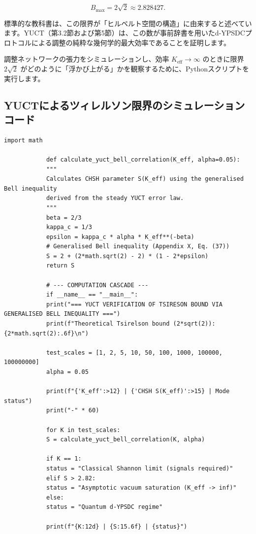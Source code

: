 \documentclass[12pt,a4paper]{article}
\begin{document}
	\[
	B_{\mathrm{max}} = 2\sqrt{2} \approx 2.828427.
	\]
	
	標準的な教科書は、この限界が「ヒルベルト空間の構造」に由来すると述べています。YUCT（第3.2節および第5節）は、この数が事前辞書を用いたd‑YPSDCプロトコルによる調整の純粋な幾何学的最大効率であることを証明します。
	
	調整ネットワークの張力をシミュレーションし、効率 \(K_{\mathrm{eff}} \to \infty\) のときに限界 \(2\sqrt{2}\) がどのように「浮かび上がる」かを観察するために、Pythonスクリプトを実行します。
	
	\subsection{YUCTによるツィレルソン限界のシミュレーションコード}
	
	\begin{tcolorbox}[
		colback=gray!5, 
		colframe=black!75, 
		title=YUCT Pythonコード：一般化ベル不等式によるツィレルソン限界の計算,
		fonttitle=\small\ttfamily,
		arc=2mm,
		fontupper=\scriptsize,
		left=1mm, right=1mm,
		top=1mm, bottom=1mm
		]
		\begin{lstlisting}[basicstyle=\scriptsize\ttfamily, breaklines=true, columns=fullflexible]
			import math
			
			def calculate_yuct_bell_correlation(K_eff, alpha=0.05):
			"""
			Calculates CHSH parameter S(K_eff) using the generalised Bell inequality
			derived from the steady YUCT error law.
			"""
			beta = 2/3
			kappa_c = 1/3
			epsilon = kappa_c * alpha * K_eff**(-beta)
			# Generalised Bell inequality (Appendix X, Eq. (37))
			S = 2 + (2*math.sqrt(2) - 2) * (1 - 2*epsilon)
			return S
			
			# --- COMPUTATION CASCADE ---
			if __name__ == "__main__":
			print("=== YUCT VERIFICATION OF TSIRESON BOUND VIA GENERALISED BELL INEQUALITY ===")
			print(f"Theoretical Tsirelson bound (2*sqrt(2)): {2*math.sqrt(2):.6f}\n")
			
			test_scales = [1, 2, 5, 10, 50, 100, 1000, 100000, 100000000]
			alpha = 0.05
			
			print(f"{'K_eff':>12} | {'CHSH S(K_eff)':>15} | Mode status")
			print("-" * 60)
			
			for K in test_scales:
			S = calculate_yuct_bell_correlation(K, alpha)
			
			if K == 1:
			status = "Classical Shannon limit (signals required)"
			elif S > 2.82:
			status = "Asymptotic vacuum saturation (K_eff -> inf)"
			else:
			status = "Quantum d-YPSDC regime"
			
			print(f"{K:12d} | {S:15.6f} | {status}")
		\end{lstlisting}
	\end{tcolorbox}
	
\end{document}
